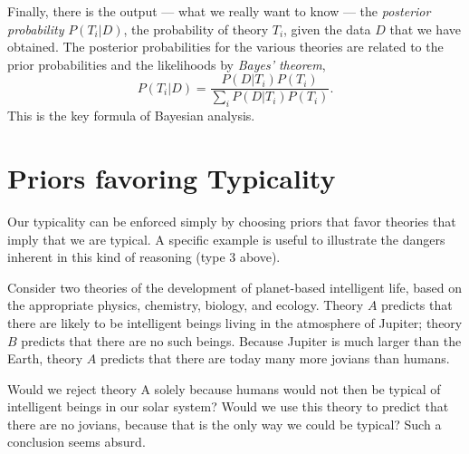\documentclass[pra,floatfix,preprint,nofootinbib,12pt]{revtex4}
\begin{document}
Finally, there is the output --- what we really want to know --- the {\it posterior probability} $P(T_i|D)$, the
probability of theory $T_i$, given the data $D$ that we have obtained.  The posterior
probabilities for the various theories are related to the prior probabilities and the likelihoods
by {\it Bayes' theorem},
\begin{equation}
P(T_i|D) = \frac{P(D|T_i) P(T_i)}{\sum_i  P(D|T_i) P(T_i)}  .
\label{bayesthm}
\end{equation} 
This is the key formula of Bayesian analysis. 

\section{Priors favoring Typicality} 

Our typicality can be enforced simply by choosing priors that favor theories that imply that we are 
typical. A specific example is useful to illustrate the dangers inherent in this kind of reasoning 
(type 3 above). 

Consider two theories of the development of planet-based intelligent life,
based on the appropriate physics, chemistry, biology, and ecology.
Theory $A$ predicts that there are likely to be intelligent beings living
in the atmosphere of Jupiter; theory $B$ predicts that there are no such beings.
Because Jupiter is much larger than the Earth, theory $A$ predicts that
there are today many more jovians than humans.  

Would we reject theory A solely because humans
would not then be typical of intelligent beings in our solar system? Would we use this theory to predict that there are no jovians, because that is the only way we could be typical?  
Such a conclusion seems absurd.
\end{document}

